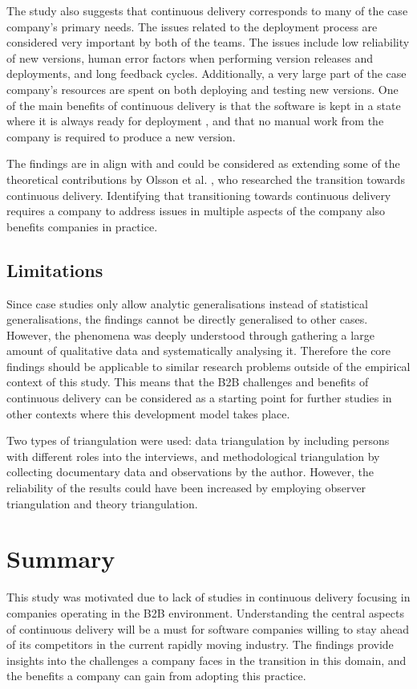 \documentclass[lnbip]{svmultln}
\begin{document}
The study also suggests that continuous delivery corresponds to many of the case company's primary needs. The issues related to the deployment process are considered very important by both of the teams. The issues include low reliability of new versions, human error factors when performing version releases and deployments, and long feedback cycles. Additionally, a very large part of the case company's resources are spent on both deploying and testing new versions. One of the main benefits of continuous delivery is that the software is kept in a state where it is always ready for deployment \cite{cdbook}, and that no manual work from the company is required to produce a new version. 



The findings are in align with and could be considered as extending some of the theoretical contributions by Olsson et al. \cite{olsson2012climbing}, who researched the transition towards continuous delivery. Identifying that transitioning towards continuous delivery requires a company to address issues in multiple aspects of the company also benefits companies in practice.   

\subsection{Limitations}
Since case studies only allow analytic generalisations instead of statistical generalisations, the findings cannot be directly generalised to other cases. However, the phenomena was deeply understood through gathering a large amount of qualitative data and systematically analysing it. Therefore the core findings should be applicable to similar research problems outside of the empirical context of this study. This means that the B2B challenges and benefits of continuous delivery can be considered as a starting point for further studies in other contexts where this development model takes place.

Two types of triangulation were used: data triangulation by including persons with different roles into the interviews, and methodological triangulation by collecting documentary data and observations by the author. However, the reliability of the results could have been increased by employing observer triangulation and theory triangulation. 

\section{Summary}
This study was motivated due to lack of studies in continuous delivery focusing in companies operating in the B2B environment. Understanding the central aspects of continuous delivery will be a must for software companies willing to stay ahead of its competitors in the current rapidly moving industry. The findings provide insights into the challenges a company faces in the transition in this domain, and the benefits a company can gain from adopting this practice.
\end{document}
